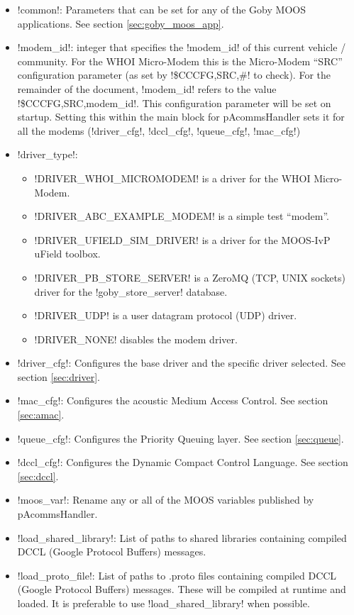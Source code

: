 \begin{itemize}
\item !common!: Parameters that can be set for any of the Goby MOOS applications. See section \ref{sec:goby_moos_app}.
\item !modem_id!: integer that specifies the !modem_id! of this current vehicle / community. For the WHOI Micro-Modem this is the Micro-Modem ``SRC'' configuration parameter (as set by !\$CCCFG,SRC,#! to check). For the remainder of the document, !modem_id! refers to the value !\$CCCFG,SRC,modem_id!. This configuration parameter will be set on startup. Setting this within the main block for pAcommsHandler sets it for all the modems (!driver_cfg!, !dccl_cfg!, !queue_cfg!, !mac_cfg!)
\item !driver_type!: 
\begin{itemize}
\item !DRIVER_WHOI_MICROMODEM! is a driver for the WHOI Micro-Modem. 
\item !DRIVER_ABC_EXAMPLE_MODEM! is a simple test ``modem''.
\item !DRIVER_UFIELD_SIM_DRIVER! is a driver for the MOOS-IvP uField toolbox.
\item !DRIVER_PB_STORE_SERVER! is a ZeroMQ (TCP, UNIX sockets) driver for the !goby_store_server! database.
\item !DRIVER_UDP! is a user datagram protocol (UDP) driver.
\item !DRIVER_NONE! disables the modem driver.
\end{itemize}
\item !driver_cfg!: Configures the base driver and the specific driver selected. See section \ref{sec:driver}.
\item !mac_cfg!: Configures the acoustic Medium Access Control. See section \ref{sec:amac}.
\item !queue_cfg!: Configures the Priority Queuing layer. See section \ref{sec:queue}.
\item !dccl_cfg!: Configures the Dynamic Compact Control Language. See section \ref{sec:dccl}.
\item !moos_var!: Rename any or all of the MOOS variables published by pAcommsHandler.
\item !load_shared_library!: List of paths to shared libraries containing compiled DCCL (Google Protocol Buffers) messages.
\item !load_proto_file!: List of paths to .proto files containing compiled DCCL (Google Protocol Buffers) messages. These will be compiled at runtime and loaded. It is preferable to use !load_shared_library! when possible.

\end{itemize}
